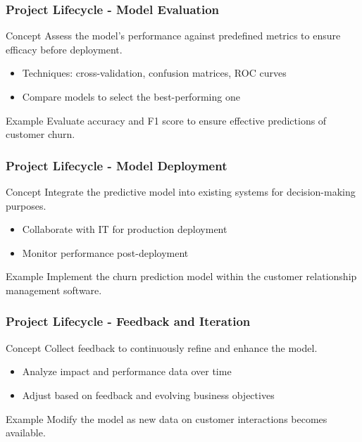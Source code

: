 \documentclass[aspectratio=169]{beamer}
\begin{document}
\begin{frame}[fragile]
    \frametitle{Project Lifecycle - Model Evaluation}
    \begin{block}{Concept}
        Assess the model's performance against predefined metrics to ensure efficacy before deployment.
    \end{block}
    \begin{itemize}
        \item Techniques: cross-validation, confusion matrices, ROC curves
        \item Compare models to select the best-performing one
    \end{itemize}
    \begin{block}{Example}
        Evaluate accuracy and F1 score to ensure effective predictions of customer churn.
    \end{block}
\end{frame}

\begin{frame}[fragile]
    \frametitle{Project Lifecycle - Model Deployment}
    \begin{block}{Concept}
        Integrate the predictive model into existing systems for decision-making purposes.
    \end{block}
    \begin{itemize}
        \item Collaborate with IT for production deployment
        \item Monitor performance post-deployment
    \end{itemize}
    \begin{block}{Example}
        Implement the churn prediction model within the customer relationship management software.
    \end{block}
\end{frame}

\begin{frame}[fragile]
    \frametitle{Project Lifecycle - Feedback and Iteration}
    \begin{block}{Concept}
        Collect feedback to continuously refine and enhance the model.
    \end{block}
    \begin{itemize}
        \item Analyze impact and performance data over time
        \item Adjust based on feedback and evolving business objectives
    \end{itemize}
    \begin{block}{Example}
        Modify the model as new data on customer interactions becomes available.
    \end{block}
\end{frame}
\end{document}
